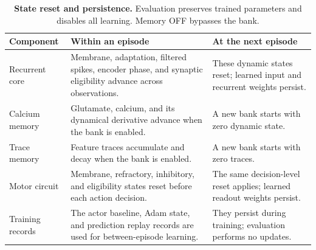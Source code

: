 \begin{table}[htbp]\centering\small
\caption{\textbf{State reset and persistence.} Evaluation preserves trained parameters and disables all learning. Memory OFF bypasses the bank.}\label{tab:state}
\begin{tabularx}{\linewidth}{>{\raggedright\arraybackslash}p{.25\linewidth}>{\raggedright\arraybackslash}X>{\raggedright\arraybackslash}X}\toprule
Component & Within an episode & At the next episode\\\midrule
Recurrent core & Membrane, adaptation, filtered spikes, encoder phase, and synaptic eligibility advance across observations. & These dynamic states reset; learned input and recurrent weights persist.\\
Calcium memory & Glutamate, calcium, and its dynamical derivative advance when the bank is enabled. & A new bank starts with zero dynamic state.\\
Trace memory & Feature traces accumulate and decay when the bank is enabled. & A new bank starts with zero traces.\\
Motor circuit & Membrane, refractory, inhibitory, and eligibility states reset before each action decision. & The same decision-level reset applies; learned readout weights persist.\\
Training records & The actor baseline, Adam state, and prediction replay records are used for between-episode learning. & They persist during training; evaluation performs no updates.\\\bottomrule
\end{tabularx}
\end{table}
